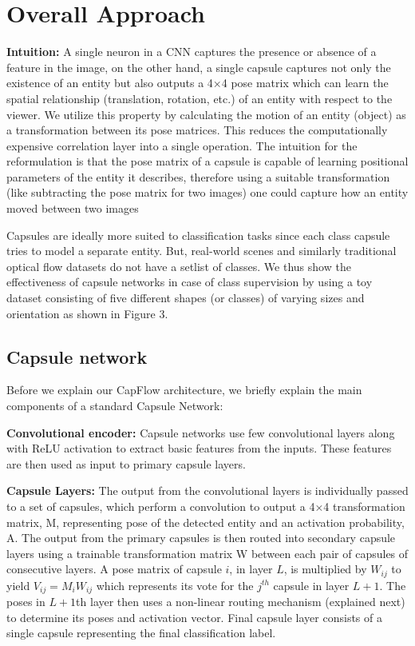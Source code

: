 \documentclass[11pt]{article}
\begin{document}
\section{Overall Approach}
\textbf{Intuition:} A single neuron in a CNN captures the presence or absence of a feature in the image, on the other hand,
a single capsule captures not only the existence of an entity but also outputs a 4×4 pose matrix which can learn the
spatial relationship (translation, rotation, etc.) of an entity
with respect to the viewer. We utilize this property by calculating the motion of an entity (object) as a transformation
between its pose matrices. This reduces the computationally expensive correlation layer into a single operation. The
intuition for the reformulation is that the pose matrix of a
capsule is capable of learning positional parameters of the
entity it describes, therefore using a suitable transformation
(like subtracting the pose matrix for two images) one could
capture how an entity moved between two images

Capsules are ideally more suited to classification tasks
since each class capsule tries to model a separate entity.
But, real-world scenes and similarly traditional optical flow
datasets do not have a setlist of classes. We thus show the effectiveness of capsule networks in case of class supervision
by using a toy dataset consisting of five different shapes (or
classes) of varying sizes and orientation as shown in Figure
3.

\subsection{Capsule network}
Before we explain our CapFlow architecture, we briefly
explain the main components of a standard Capsule Network:

\textbf{Convolutional encoder:} Capsule networks use few convolutional layers along with ReLU activation to extract basic features from the inputs. These features are then used as
input to primary capsule layers.

\textbf{Capsule Layers:} The output from the convolutional layers is individually passed to a set of capsules, which perform a convolution to output a 4×4 transformation matrix,
M, representing pose of the detected entity and an activation probability, A. The output from the primary capsules is
then routed into secondary capsule layers using a trainable
transformation matrix W between each pair of capsules of
consecutive layers. A pose matrix of capsule \(i\), in layer \(L\),
is multiplied by \(W_{ij}\) to yield \(V_{ij} = M_{i}W_{ij}\) which represents its vote for the \(j^{th}\)
 capsule in layer \(L + 1\). The poses
in \(L + 1\)th layer then uses a non-linear routing mechanism
(explained next) to determine its poses and activation vector. Final capsule layer consists of a single capsule representing the final classification label.
\end{document}
